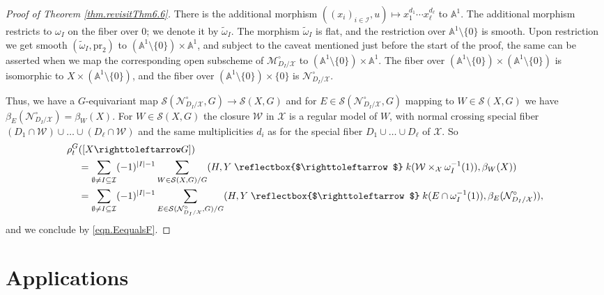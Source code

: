 \documentclass[12pt,reqno]{amsart}
\theoremstyle{plain}
\theoremstyle{remark}
\theoremstyle{definition}
\numberwithin{equation}{section}
\newcommand{\A}{{\mathbb A}}
\newcommand{\cI}{{\mathcal I}}
\newcommand{\cM}{{\mathcal M}}
\newcommand{\cN}{{\mathcal N}}
\newcommand{\cS}{{\mathcal S}}
\newcommand{\cX}{{\mathcal X}}
\newcommand{\cW}{{\mathcal W}}
\newcommand{\actsfromleft}{\mathrel{\reflectbox{$\righttoleftarrow$}}}
\newcommand{\actsfromright}{\righttoleftarrow}
\begin{document}
\begin{proof}[Proof of Theorem \ref{thm.revisitThm6.6}]
There is the additional morphism $((x_i)_{i\in \cI},u)\mapsto x_1^{d_1}\cdots x_\ell^{d_\ell}$ to $\A^1$.
The additional morphism restricts to $\omega_I$ on the fiber over $0$; we denote it by $\tilde\omega_I$.
The morphism $\tilde\omega_I$ is flat, and the restriction over $\A^1\setminus \{0\}$ is smooth.
Upon restriction we get smooth $(\tilde\omega_I,\mathrm{pr}_2)$ to $(\A^1\setminus \{0\})\times \A^1$, and
subject to the caveat mentioned just before the start of the proof, the same can be asserted
when we map the corresponding open subscheme
of $\cM_{D_I/\cX}^\circ$
to $(\A^1\setminus \{0\})\times \A^1$.
The fiber over $(\A^1\setminus \{0\})\times (\A^1\setminus \{0\})$ is isomorphic to $X\times (\A^1\setminus \{0\})$, and the fiber over $(\A^1\setminus \{0\})\times \{0\}$ is $\cN_{D_I/\cX}^\circ$.

Thus, we have a $G$-equivariant map $\cS(\mathcal{N}_{D_I/\cX}^\circ,G)\to \cS(X,G)$ 
and for $E\in \cS(\mathcal{N}_{D_I/\cX}^\circ,G)$ mapping to
$W\in \cS(X,G)$ we have
$\beta_E(\mathcal{N}_{D_I/\cX}^\circ)=\beta_W(X)$.
For $W\in \cS(X,G)$ the closure $\cW$ in $\cX$ is a regular model of $W$, with normal crossing special fiber $(D_1\cap \cW)\cup\dots\cup (D_\ell\cap \cW)$ and the same multiplicities $d_i$ as for the special fiber $D_1\cup\dots\cup D_\ell$ of $\cX$.
So
\begin{align*}
\rho^G_t&([X\actsfromright G])\\
&=\sum_{\emptyset\ne I\subseteq\cI}(-1)^{|I|-1}\sum_{W\in \cS(X,G)/G}
(H,Y\actsfromleft k(\cW\times_{\cX}\omega_I^{-1}(1)),\beta_W(X))\\
&=\sum_{\emptyset\ne I\subseteq\cI}(-1)^{|I|-1}\sum_{E\in\cS(\mathcal{N}_{D_I/\cX}^\circ,G)/G}(H,Y\actsfromleft k(E\cap \omega_I^{-1}(1)),\beta_E(\mathcal{N}_{D_I/\cX}^\circ)),
\end{align*}
and we conclude by \eqref{eqn.EequalsF}.
\end{proof}




\section{Applications}
\label{sect:apply}
\end{document}
